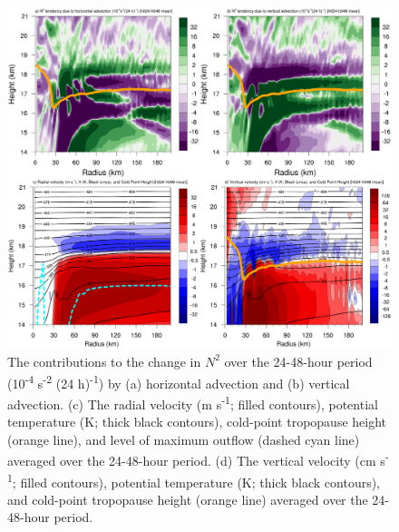 \documentclass{ametsoc}
\begin{document}

\begin{figure}[ht]
\centerline{\includegraphics[width=39pc]{figures/h024-h048-adv.png}}
\caption{The contributions to the change in $N^2$ over the 24-48-hour period (10\textsuperscript{-4} s\textsuperscript{-2} (24 h)\textsuperscript{-1}) by (a) horizontal advection and (b) vertical advection. (c) The radial velocity (m s\textsuperscript{-1}; filled contours), potential temperature (K; thick black contours), cold-point tropopause height (orange line), and level of maximum outflow (dashed cyan line) averaged over the 24-48-hour period. (d) The vertical velocity (cm s\textsuperscript{-1}; filled contours), potential temperature (K; thick black contours), and cold-point tropopause height (orange line) averaged over the 24-48-hour period.}
\label{fig:adv-24-48}
\end{figure}

\end{document}
